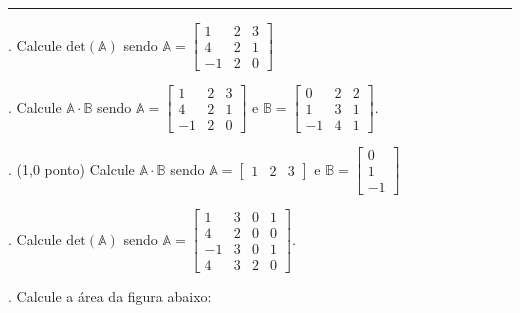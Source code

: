 \documentclass{article}
\newcommand{\um}{(1,0 ponto) }
\begin{document}
\par\noindent\rule{\textwidth}{1pt}

\vspace{0.25 cm}

. Calcule $\mathrm{det}(\mathbb{A})$ sendo $\mathbb{A} = \left[ \begin{matrix} 1&2&3 \\ 4&2&1 \\ -1&2&0 \end{matrix} \right]$

. Calcule $\mathbb{A} \cdot \mathbb{B}$ sendo $\mathbb{A} = \left[ \begin{matrix} 1&2&3 \\ 4&2&1 \\ -1&2&0 \end{matrix} \right]$ e $\mathbb{B} = \left[ \begin{matrix} 0&2&2 \\ 1&3&1 \\ -1&4&1 \end{matrix} \right]$.

. \um Calcule $\mathbb{A} \cdot \mathbb{B}$ sendo $\mathbb{A} = \left[ \begin{matrix} 1&2&3 \end{matrix} \right]$ e $\mathbb{B} = \left[ \begin{matrix} 0 \\ 1 \\ -1 \end{matrix} \right]$

. Calcule $\mathrm{det}(\mathbb{A})$ sendo $\mathbb{A} = \left[ \begin{matrix} 1&3&0&1 \\ 4&2&0&0 \\ -1&3&0&1 \\ 4&3&2&0 \end{matrix} \right]$.

. Calcule a área da figura abaixo:
\end{document}
